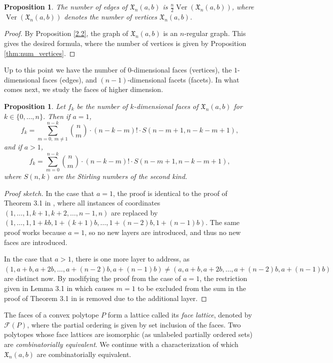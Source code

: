 \documentclass[11pt]{amsart}
\newtheorem{proposition}[theorem]{Proposition}
\theoremstyle{definition}
\newcommand{\0}{\emptyset}
\newcommand{\Xn}{\mathfrak{X}_{n}(a,b)}
\DeclareMathOperator{\Ver}{Ver}
\begin{document}
\begin{proposition}
The number of edges of $\Xn$ is $\frac{n}{2}\Ver(\Xn)$, where $\Ver(\Xn)$ denotes the number of vertices $\Xn$.
\end{proposition}

\begin{proof}
By Proposition \ref{2.2}, the graph of $\Xn$ is an $n$-regular graph. This gives the desired formula, where the number of vertices is given by Proposition \ref{thm:num_vertices}.
\end{proof}

Up to this point we have the number of $0$-dimensional faces (vertices), the $1$-dimensional faces (edges), and $(n-1)$-dimensional facets (facets).
In what comes next, we study the  faces of higher dimension.

\begin{proposition}\label{thm:faces}
Let $f_{k}$ be the number of $k$-dimensional faces of $\Xn$ for $k \in \{ 0, \ldots, n\}$. Then if $a=1$,
\[f_{k} = \sum_{m=0,\ m \neq 1}^{n-k} \binom{n}{m} \cdot (n-k-m)! \cdot S(n-m+1, n-k-m+1),\] and if $a > 1$,
\[f_{k} = \sum_{m=0}^{n-k} \binom{n}{m} \cdot (n-k-m)! \cdot S(n-m+1, n-k-m+1),\] where $S(n,k)$ are the Stirling numbers of the second kind.   
\end{proposition}

\begin{proof}[Proof sketch]
In the case that $a=1$, the proof is identical to the proof of Theorem 3.1 in \cite{AW}, where all instances of coordinates $(1, \ldots, 1, k+1, k+2, \ldots, n-1, n)$ are replaced by $(1, \ldots, 1, 1+kb, 1+(k+1)b, \ldots, 1+(n-2)b, 1+(n-1)b)$. The same proof works because $a=1$, so no new layers are introduced, and thus no new faces are introduced.

In the case that $a >1$, there is one more layer to address, as $(1, a+b, a+2b, \ldots, a+(n-2)b, a+(n-1)b) \neq (a, a+b, a+2b, \ldots, a+(n-2)b, a+(n-1)b)$ are distinct now. By modifying the proof from the case of $a=1$, the restriction given in Lemma 3.1 in \cite{AW} which causes $m = 1$ to be excluded from the sum in the proof of Theorem 3.1 in \cite{AW} is removed due to the additional layer.
\end{proof}


The faces of a convex polytope $P$ form a lattice called its \emph{face lattice}, denoted by $\mathcal{F}(P)$, where the partial ordering is given by set inclusion of the faces.
Two polytopes whose face lattices are isomorphic (as unlabeled partially ordered sets) are \emph{combinatorially equivalent}.
We continue with a characterization of which $\Xn$ are combinatorially equivalent.
\end{document}
